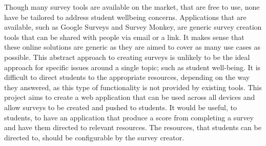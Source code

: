 Though many survey tools are available on the market, that are free to use, none have be tailored to address student wellbeing concerns.
Applications that are available, such as Google Surveys and Survey Monkey, are generic survey creation tools that can be shared with 
people via email or a link.
It makes sense that these online solutions are generic as they are aimed to cover as many use cases as possible.
This abstract approach to creating surveys is unlikely to be the ideal approach for specific issues around a single topic; such as
student well-being.
It is difficult to direct students to the appropriate resources, depending on the way they answered, as this type of functionality is not
provided by existing tools.
This project aims to create a web application that can be used across all devices and allow surveys to be created and pushed to students.
It would be useful, to students, to have an application that produce a score from completing a survey and have them directed to relevant
resources. The resources, that students can be directed to, should be configurable by the survey creator.










